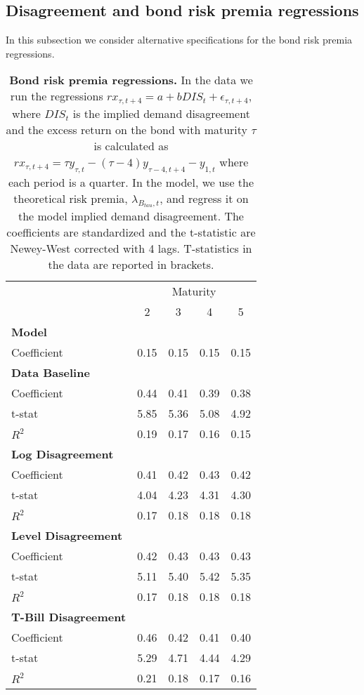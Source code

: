 \subsection{Disagreement and bond risk premia regressions}
In this subsection we consider alternative specifications for the bond risk premia regressions. 
\begin{table}[H]
\centering
\caption{\textbf{Bond risk premia regressions.} In the data we run the regressions 
$rx_{\tau,t+4} = a + b DIS_t + \epsilon_{\tau,t+4}$, where $DIS_t$ is the implied demand disagreement and the excess return on the bond with maturity $\tau$ is calculated as $rx_{\tau,t+4} = \tau y_{\tau,t} - \left(\tau-4\right)y_{\tau-4,t+4} - y_{1,t}$ where each period is a quarter. In the model, we use the theoretical risk premia, $\lambda_{B_{tau},t}$, and regress it on the model implied demand disagreement. The coefficients are standardized and the t-statistic are Newey-West corrected with 4 lags. T-statistics in the data are reported in brackets.}
\begin{tabular}{lcccc}
\hline
\hline
& \multicolumn{4}{c}{Maturity} \\
& 2 & 3 & 4 & 5 \\
\hline
\textbf{Model} \\
Coefficient & 0.15 & 0.15 & 0.15 & 0.15 \\
\hline
\textbf{Data Baseline} \\
Coefficient & 0.44 & 0.41 & 0.39 & 0.38 \\
t-stat & 5.85 & 5.36 & 5.08 & 4.92 \\
$R^2$ & 0.19 & 0.17 & 0.16 & 0.15 \\
\hline
\textbf{Log Disagreement} \\
Coefficient & 0.41 & 0.42 & 0.43 & 0.42 \\
t-stat & 4.04 & 4.23 & 4.31 & 4.30 \\
$R^2$ & 0.17 & 0.18 & 0.18 & 0.18 \\
\hline
\textbf{Level Disagreement} \\
Coefficient & 0.42 & 0.43 & 0.43 & 0.43 \\
t-stat & 5.11 & 5.40 & 5.42 & 5.35 \\
$R^2$ & 0.17 & 0.18 & 0.18 & 0.18 \\
\hline
\textbf{T-Bill Disagreement} \\
Coefficient & 0.46 & 0.42 & 0.41 & 0.40 \\
t-stat & 5.29 & 4.71 & 4.44 & 4.29 \\
$R^2$ & 0.21 & 0.18 & 0.17 & 0.16 \\
\hline
\hline
\end{tabular}
\label{table:rx2Dis}
\end{table}

